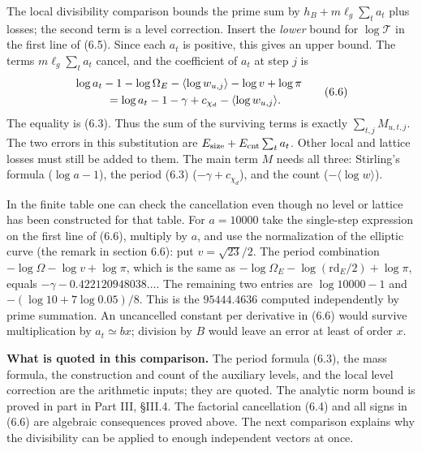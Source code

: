 \documentclass[11pt,letterpaper]{article}
\begin{document}
{The local divisibility comparison bounds the prime sum by $h_B+m\ell_g\sum_t a_t$ plus losses; the second term is a level correction. Insert the \textit{lower} bound for $\log\mathcal T$ in the first line of (6.5). Since each $a_t$ is positive, this gives an upper bound. The terms $m\ell_g\sum_t a_t$ cancel, and the coefficient of $a_t$ at step $j$ is
\begin{equation}\label{D:98}
 \begin{aligned}
 &\log a_t-1-\log\Omega_E-\langle\log w_{u,j}\rangle-\log v+\log\pi\\
 &\hspace{10mm}=\log a_t-1-\gamma+c_{\chi_d}-\langle\log w_{u,j}\rangle .
 \end{aligned}                                                    \tag{6.6}
\end{equation}
The equality is (6.3). Thus the sum of the surviving terms is exactly $\sum_{t,j}M_{u,t,j}$. The two errors in this substitution are $E_{\rm size}+E_{\rm cnt}\sum_t a_t$. Other local and lattice losses must still be added to them. The main term $M$ needs all three: Stirling's formula ($\log a-1$), the period (6.3) ($-\gamma+c_{\chi_d}$), and the count ($-\langle\log w\rangle$).

In the finite table one can check the cancellation even though no level or lattice has been constructed for that table. For $a=10000$ take the single-step expression on the first line of (6.6), multiply by $a$, and use the normalization of the elliptic curve (the remark in section 6.6): put $v=\sqrt{23}/2$. The period combination $-\log\Omega-\log v+\log\pi$, which is the same as $-\log\Omega_E-\log(\mathrm{rd}_E/2)+\log\pi$, equals $-\gamma-0.422120948038\ldots$. The remaining two entries are $\log10000-1$ and $-(\log10+7\log0.05)/8$. This is the $95444.4636$ computed independently by prime summation. An uncancelled constant per derivative in (6.6) would survive multiplication by $a_t\simeq bx$; division by $B$ would leave an error at least of order $x$.

\textbf{What is quoted in this comparison.} The period formula (6.3), the mass formula, the construction and count of the auxiliary levels, and the local level correction are the arithmetic inputs; they are quoted. The analytic norm bound is proved in part in Part III, \S III.4. The factorial cancellation (6.4) and all signs in (6.6) are algebraic consequences proved above. The next comparison explains why the divisibility can be applied to enough independent vectors at once.

}
\end{document}
